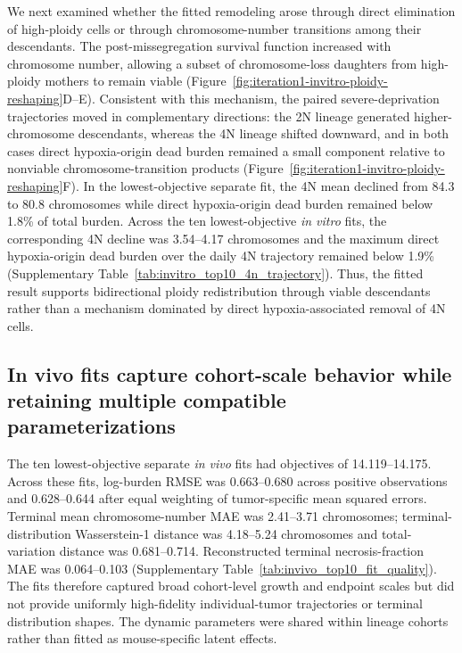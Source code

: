 \documentclass[11pt]{article}
\begin{document}
We next examined whether the fitted remodeling arose through direct elimination of high-ploidy cells or through chromosome-number transitions among their descendants. The post-missegregation survival function increased with chromosome number, allowing a subset of chromosome-loss daughters from high-ploidy mothers to remain viable (Figure~\ref{fig:iteration1-invitro-ploidy-reshaping}D--E). Consistent with this mechanism, the paired severe-deprivation trajectories moved in complementary directions: the 2N lineage generated higher-chromosome descendants, whereas the 4N lineage shifted downward, and in both cases direct hypoxia-origin dead burden remained a small component relative to nonviable chromosome-transition products (Figure~\ref{fig:iteration1-invitro-ploidy-reshaping}F). In the lowest-objective separate fit, the 4N mean declined from 84.3 to 80.8 chromosomes while direct hypoxia-origin dead burden remained below 1.8\% of total burden. Across the ten lowest-objective \textit{in vitro} fits, the corresponding 4N decline was 3.54--4.17 chromosomes and the maximum direct hypoxia-origin dead burden over the daily 4N trajectory remained below 1.9\% (Supplementary Table~\ref{tab:invitro_top10_4n_trajectory}). Thus, the fitted result supports bidirectional ploidy redistribution through viable descendants rather than a mechanism dominated by direct hypoxia-associated removal of 4N cells.

\subsection*{In vivo fits capture cohort-scale behavior while retaining multiple compatible parameterizations}

The ten lowest-objective separate \textit{in vivo} fits had objectives of 14.119--14.175. Across these fits, log-burden RMSE was 0.663--0.680 across positive observations and 0.628--0.644 after equal weighting of tumor-specific mean squared errors. Terminal mean chromosome-number MAE was 2.41--3.71 chromosomes; terminal-distribution Wasserstein-1 distance was 4.18--5.24 chromosomes and total-variation distance was 0.681--0.714. Reconstructed terminal necrosis-fraction MAE was 0.064--0.103 (Supplementary Table~\ref{tab:invivo_top10_fit_quality}). The fits therefore captured broad cohort-level growth and endpoint scales but did not provide uniformly high-fidelity individual-tumor trajectories or terminal distribution shapes. The dynamic parameters were shared within lineage cohorts rather than fitted as mouse-specific latent effects.
\end{document}
